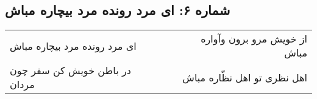 \begin{center}
\section*{شماره ۶: ای مرد رونده مرد بیچاره مباش}
\label{sec:006}
\begin{longtable}{l p{0.5cm} r}
ای مرد رونده مرد بیچاره مباش
&&
از خویش مرو برون وآواره مباش
\\
در باطن خویش کن سفر چون مردان
&&
اهل نظری تو اهل نظّاره مباش
\\
\end{longtable}
\end{center}
